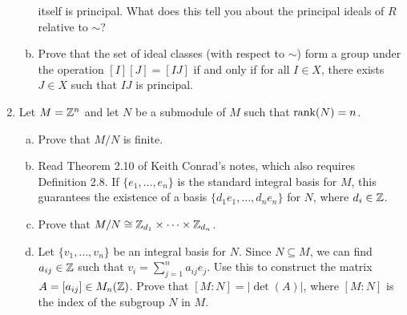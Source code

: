 \begin{enumerate}[leftmargin=1.5cm, label={{\bf A2-\arabic*}}]
\begin{enumerate}[(a)]
        itself is principal. What does this tell you about the principal 
        ideals of $R$ relative to $\sim$?
        \item Prove that the set of ideal classes (with respect to $\sim$) form a 
        group under the operation $[I][J] = [IJ]$ if and only if for all 
        $I \in X$, there exists $J \in X$ such that $IJ$ is principal.
    \end{enumerate} 
    \item \label{A2-4} Let $M = \mathbb{Z}^n$ and let $N$ be a submodule of $M$ such that $\operatorname{rank}(N) = n$. 
    \begin{enumerate}[(a)]
        \item Prove that $M/N$ is finite. 
        \item Read Theorem 2.10 of Keith Conrad's notes, which also 
        requires Definition 2.8. If $\{e_1, \dots, e_n\}$ is 
        the standard integral basis for $M$, this guarantees the existence of a 
        basis $\{d_1e_1, \dots, d_ne_n\}$ for $N$, where $d_i \in \mathbb{Z}$. 
        \item Prove that $M/N \cong \mathbb{Z}_{d_1} \times \cdots \times \mathbb{Z}_{d_n}$. 
        \item Let $\{v_1, \dots, v_n\}$ be an integral basis for $N$. 
        Since $N \subseteq M$, we can find $a_{ij} \in \mathbb{Z}$ such that 
        $v_i = \sum_{j=1}^n a_{ij} e_j$. Use this to construct the matrix 
        $A = [a_{ij}] \in M_n(\mathbb{Z})$. Prove that $[M : N] = \lvert\det(A)\rvert$, where 
        $[M : N]$ is the index of the subgroup $N$ in $M$.
    \end{enumerate}
\end{enumerate}

